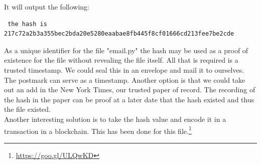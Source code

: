 \documentclass{tufte-handout}
\begin{document}

\normalsize
It will output the following:
\small
\begin{shaded}
\begin{verbatim}
 the hash is 
217c72a2b3a355bec2bda20e5280eaabae8fb445f8cf01666cd213fee7be2cde
\end{verbatim}
\end{shaded}



\normalsize
As a unique identifier for the file "email.py" the hash may be used as a proof of existence for the file without revealing the file itself.  All that is required is a trusted timestamp.  We could seal this in an envelope and mail it to ourselves.  The postmark can serve as a timestamp.  Another option is that we could take out an add in the New York Times, our trusted paper of record.  The recording of the hash in the paper can be proof at a later date that the hash existed and thus the file existed.\\
Another interesting solution is to take the hash value and encode it in a transaction in a blockchain.  This has been done for this file.\footnote{\href{url}{https://goo.gl/ULQwKD}}



%
%
\end{document}
